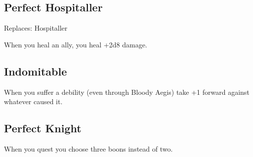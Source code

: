 \subsection{Perfect Hospitaller}


 Replaces: Hospitaller


 When you heal an ally, you heal +2d8 damage.
\subsection{Indomitable}


 When you suffer a debility (even through Bloody Aegis) take +1 forward against whatever caused it.
\subsection{Perfect Knight}


 When you quest you choose three boons instead of two.


